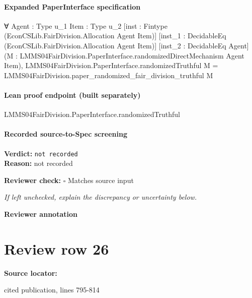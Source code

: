 \documentclass[10pt]{article}
\newcommand{\reviewerbox}{%
  \par\noindent\fbox{\parbox{0.96\linewidth}{\rule{0pt}{0.38in}}}\par
}
\newcommand{\reviewmatch}[1]{%
  \par\noindent\textbf{Reviewer check:} $\square$\; #1\par
  \noindent\emph{If left unchecked, explain the discrepancy or uncertainty below.}\par
}
\begin{document}
\paragraph{Expanded PaperInterface specification}
\begin{ReviewVerbatim}
∀ {Agent : Type u_1} {Item : Type u_2} [inst : Fintype (EconCSLib.FairDivision.Allocation Agent Item)]
  [inst_1 : DecidableEq (EconCSLib.FairDivision.Allocation Agent Item)] [inst_2 : DecidableEq Agent]
  (M : LMMS04FairDivision.PaperInterface.randomizedDirectMechanism Agent Item),
  LMMS04FairDivision.PaperInterface.randomizedTruthful M = LMMS04FairDivision.paper_randomized_fair_division_truthful M
\end{ReviewVerbatim}

\paragraph{Lean proof endpoint (built separately)}\begin{ReviewVerbatim}
LMMS04FairDivision.PaperInterface.randomizedTruthful
\end{ReviewVerbatim}

\paragraph{Recorded source-to-Spec screening}
\textbf{Verdict:} \texttt{not recorded}
\\
\textbf{Reason:} not recorded
\reviewmatch{Matches source input}
\noindent\textbf{Reviewer annotation}\par
\reviewerbox
\clearpage
\hypertarget{source-claim-b506d5d8b67ab084}{}
\section*{Review row 26}
\textbf{Source locator:} {\footnotesize\raggedright cited publication, lines 795-\allowbreak{}814\par}
\end{document}
